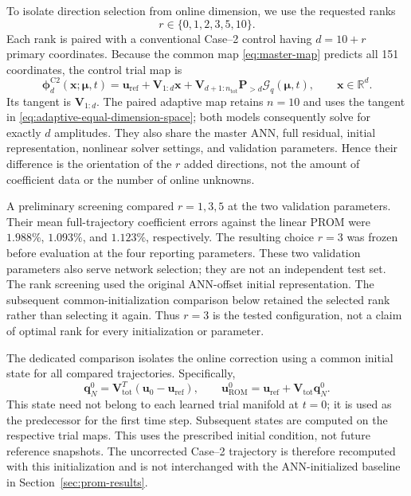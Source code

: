 \documentclass[11pt]{article}
\newcommand{\q}{\mathbf q}
\newcommand{\uvec}{\mathbf u}
\newcommand{\mub}{\bm\mu}
\begin{document}
To isolate direction selection from online dimension, we use the requested
ranks
\begin{equation}
r\in\{0,1,2,3,5,10\}.
\label{eq:adaptive-tested-ranks}
\end{equation}
Each rank is paired with a conventional Case--2 control having $d=10+r$
primary coordinates.  Because the common map
\eqref{eq:master-map} predicts all 151 coordinates, the control trial map is
\begin{equation}
\boldsymbol\phi_d^{\mathrm{C2}}(\mathbf x;\mub,t)
=\uvec_{\mathrm{ref}}+\mathbf V_{1:d}\mathbf x
+\mathbf V_{d+1:n_{\mathrm{tot}}}
\mathbf P_{>d}\mathcal G_q(\mub,t),
\qquad \mathbf x\in\mathbb R^d.
\label{eq:case2-equal-dimension-control}
\end{equation}
Its tangent is $\mathbf V_{1:d}$.  The paired adaptive map retains
$n=10$ and uses the tangent in
\eqref{eq:adaptive-equal-dimension-space}; both models consequently solve
for exactly $d$ amplitudes.  They also share the master ANN, full residual,
initial representation, nonlinear solver settings, and validation
parameters.  Hence their difference is the orientation of the $r$ added
directions, not the amount of coefficient data or the number of online
unknowns.

A preliminary screening compared $r=1,3,5$ at the two validation
parameters.  Their mean full-trajectory coefficient errors against the
linear PROM were $1.988\%$, $1.093\%$, and $1.123\%$, respectively.
The resulting choice $r=3$ was frozen before evaluation at the four reporting
parameters.  These two validation parameters also serve network selection;
they are not an independent test set.  The rank screening used the original
ANN-offset initial representation.  The subsequent common-initialization
comparison below retained the selected rank rather than selecting it again.
Thus $r=3$ is the tested configuration, not a claim of optimal rank for every
initialization or parameter.

The dedicated comparison isolates the online correction using a
common initial state for all compared trajectories.  Specifically,
\begin{equation}
\q_N^0=\mathbf V_{\mathrm{tot}}^T
\left(\uvec_0-\uvec_{\mathrm{ref}}\right),\qquad
\uvec_{\mathrm{ROM}}^0=\uvec_{\mathrm{ref}}+
\mathbf V_{\mathrm{tot}}\q_N^0.
\label{eq:adaptive-common-initial}
\end{equation}
This state need not belong to each learned trial manifold at $t=0$; it is
used as the predecessor for the first time step.  Subsequent states are
computed on the respective trial maps.  This uses the prescribed initial
condition, not future reference snapshots.  The uncorrected Case--2
trajectory is therefore recomputed with this initialization and is not
interchanged with the ANN-initialized baseline in
Section~\ref{sec:prom-results}.
\end{document}
